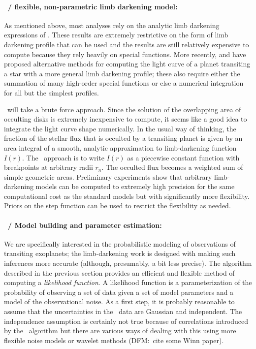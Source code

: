\documentclass[letterpaper,12pt,preprint]{hack_aastex}
\newcommand{\Untrendy}{\package{Untrendy}}
\newcommand{\Bart}{\package{Bart}}
\begin{document}
\paragraph{\Bart\ / flexible, non-parametric limb darkening model:}
As mentioned above, most analyses rely on the
analytic limb darkening expressions of \citet{mandel}.
These results are extremely restrictive on the form of limb darkening profile
that can be used and the results are still relatively expensive to compute
because they rely heavily on special functions.
More recently, \citet{crazyass1} and \citet{crazyass2} have proposed
alternative methods for computing the light curve of a planet transiting a
star with a more general limb darkening profile; these also require
either the summation of many
high-order special functions or else a numerical integration for
all but the simplest profiles.

\Bart\ will take a brute force approach.
Since the solution of the overlapping area of occulting disks is extremely
inexpensive to compute, it seems like a good idea to integrate the light curve
shape numerically.
In the usual way of thinking, the fraction of the stellar flux
that is occulted by a transiting planet is given by an
area integral of a smooth, analytic approximation to limb-darkening function $I(r)$.
The \Bart\ approach is to write $I(r)$ as a piecewise constant function
with breakpoints at arbitrary radii $r_n$.  The occulted flux becomes a
weighted sum of simple geometric areas.
Preliminary experiments show that arbitrary limb-darkening models can be computed to
extremely high precision for the same computational cost as the standard
\citet{mandel} models but with significantly more flexibility.
Priors on the step function can be used to restrict the flexibility as needed.

\paragraph{\Bart\ / Model building and parameter estimation:}
We are specifically interested in the probabilistic modeling
of observations of transiting exoplanets; the limb-darkening work is designed with making such inferences more accurate (although, presumably, a bit less precise).
The algorithm described in the previous section provides an efficient and
flexible method of computing a \textit{likelihood function}.
A likelihood function is a parameterization of the probability of observing a
set of data given a set of model parameters and a model of the observational
noise.
As a first step, it is probably reasonable to assume that the uncertainties in
the \Kepler\ data are Gaussian and independent.
The independence assumption is certainly not true because of correlations
introduced by the \Untrendy\ algorithm but there are various ways of dealing
with this using more flexible noise models or wavelet methods (DFM:\ cite some
Winn paper).
\end{document}
